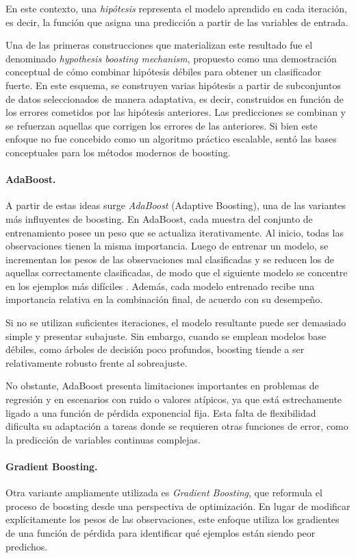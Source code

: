 En este contexto, una \textit{hipótesis} representa el modelo aprendido en
cada iteración, es decir, la función que asigna una predicción a partir de
las variables de entrada.

Una de las primeras construcciones que materializan este resultado fue el
denominado \textit{hypothesis boosting mechanism}, propuesto como una
demostración conceptual de cómo combinar hipótesis débiles para obtener un
clasificador fuerte. En este esquema, se construyen varias hipótesis a partir
de subconjuntos de datos seleccionados de manera adaptativa, es decir,
construidos en función de los errores cometidos por las hipótesis anteriores.
Las predicciones se combinan y se refuerzan aquellas que corrigen los errores
de las anteriores. Si bien este enfoque no fue concebido como un algoritmo
práctico escalable, sentó las bases conceptuales para los métodos modernos de
boosting.

\paragraph{AdaBoost.}
A partir de estas ideas surge \textit{AdaBoost} (Adaptive Boosting), una de las variantes más influyentes de boosting. En AdaBoost, cada muestra del conjunto de entrenamiento posee un peso que se actualiza iterativamente. Al inicio, todas las observaciones tienen la misma importancia. Luego de entrenar un modelo, se incrementan los pesos de las observaciones mal clasificadas y se reducen los de aquellas correctamente clasificadas, de modo que el siguiente modelo se concentre en los ejemplos más difíciles \cite{freund1997decision, freund1999short}. Además, cada modelo entrenado recibe una importancia relativa en la combinación final, de acuerdo con su desempeño.

Si no se utilizan suficientes iteraciones, el modelo resultante puede ser demasiado simple y presentar subajuste. Sin embargo, cuando se emplean modelos base débiles, como árboles de decisión poco profundos, boosting tiende a ser relativamente robusto frente al sobreajuste. 

No obstante, AdaBoost presenta limitaciones importantes en problemas de regresión y en escenarios con ruido o valores atípicos, ya que está estrechamente ligado a una función de pérdida exponencial fija. Esta falta de flexibilidad dificulta su adaptación a tareas donde se requieren otras funciones de error, como la predicción de variables continuas complejas.

\paragraph{Gradient Boosting.}
Otra variante ampliamente utilizada es \textit{Gradient Boosting}, que reformula el
proceso de boosting desde una perspectiva de optimización. En lugar de modificar
explícitamente los pesos de las observaciones, este enfoque utiliza los gradientes
de una función de pérdida para identificar qué ejemplos están siendo peor predichos.

